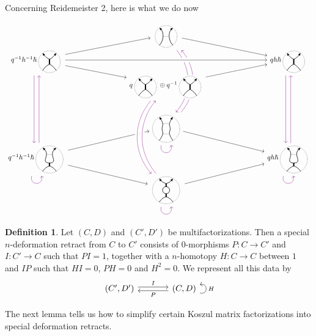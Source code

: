 \documentclass{article}
\newcommand{\sdr}[5]{%
  \begin{tikzcd}[column sep=large, ampersand replacement=\&]
    {#1} \arrow[r, "#3", shift left=0.5ex,] \arrow[r, leftarrow, "#4", shift right=0.5ex, swap] \& 
    {#2} \arrow[loop right, distance=1em, in=15, out=-15, "#5",swap]
  \end{tikzcd}%
}
\theoremstyle{plain} %
\theoremstyle{definition} %
\newtheorem{definition}[theorem]{Definition}
\theoremstyle{remark} %
\begin{document}
Concerning Reidemeister 2, here is what we do now

\[\label{r2sdr}
\begin{tikzcd}[row sep=-0.1cm, column sep=3cm]
& 
\scalebox{0.7}{\ThinEdge{}{}{}{}}
\arrow[dr]
\arrow[ddd, bend left=40, color=violet, shift right=1.5, dash pattern=on 40pt off 35pt]
\arrow[leftarrow, ddd, bend left=40, color=violet, shift left=1.5, dash pattern=on 39.5pt off 37pt]
&
\\
q^{-1}h^{-1}\hslash\scalebox{0.7}{\ThickEdge{}{}{}{}} 
\arrow[dr]
\arrow[ur]
\arrow[ddd, color=violet, shift right=1.5]
&
&
qh\hslash\scalebox{0.7}{\ThickEdge{}{}{}{}}
\arrow[ddd, color=violet, shift right=1.5]
\\
& 
q\scalebox{0.7}{\ThickEdge{}{}{}{}}\oplus q^{-1}\scalebox{0.7}{\ThickEdge{}{}{}{}}
\arrow[ur, crossing over] 
&
\\[2em]
& 
\scalebox{0.7}{\ThinThin{}{}{}{}{}}
\arrow[loop right, distance=1.5em, in=-75, out=-105, color=violet]
\arrow[dr]
&
\\
q^{-1}h^{-1}\hslash\scalebox{0.7}{\ThinThick{}{}{}{}{}} 
\arrow[loop right, distance=1.5em, in=-75, out=-105, color=violet]
\arrow[ur]
\arrow[dr]
\arrow[uuu, color=violet, shift right=1.5]
&& 
qh\hslash\scalebox{0.7}{\ThinThick{}{}{}{}{}}
\arrow[uuu, color=violet, shift right=1.5]
\arrow[loop right, distance=1.5em, in=-75, out=-105, color=violet]
\\
& 
\scalebox{0.7}{\Bigon{}{}{}{}{}} 
\arrow[ur]
\arrow[loop right, distance=1.5em, in=-75, out=-105, color=violet] 
&
\arrow[ddd, from=3-2, to=6-2, bend right=40, crossing over, color=violet, shift right=1.5] 
\arrow[uuu, from=6-2, to=3-2, bend left=40, crossing over, color=violet, shift right=1.5] 
\arrow[ur, from=3-2, to=2-3, crossing over] 
\arrow[rr, from=2-1, to=2-3, crossing over] 
\end{tikzcd}
\]


\begin{definition}
Let $(C,D)$ and $(C',D')$ be multifactorizations. Then a special $n$-deformation retract from $C$ to $C'$ consists of 0-morphisms $P:C\to C'$ and $I:C'\to C$ such that $PI=1$, together with a $n$-homotopy $H:C\to C$ between $1$ and $IP$ such that $HI=0$, $PH=0$ and $H^2=0$. We represent all this data by
$$\sdr{(C',D')}{(C,D)}{I}{P}{H}$$
\end{definition}

The next lemma tells us how to simplify certain Koszul matrix factorizations into special deformation retracts.
\end{document}

